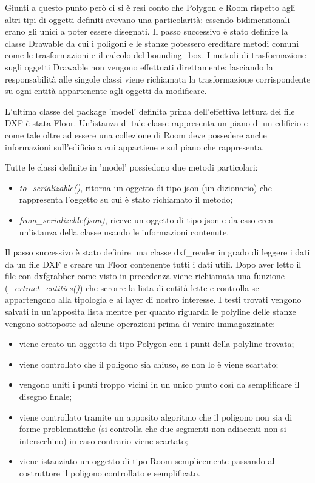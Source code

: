 \documentclass[12pt]{report}
\begin{document}
Giunti a questo punto però ci si è resi conto che Polygon e Room rispetto agli altri tipi di oggetti definiti avevano una particolarità: essendo bidimensionali erano gli unici a poter essere disegnati.
Il passo successivo è stato definire la classe Drawable da cui i poligoni e le stanze potessero ereditare metodi comuni come le trasformazioni e il calcolo del bounding\_box.
I metodi di trasformazione sugli oggetti Drawable non vengono effettuati direttamente: lasciando la responsabilità alle singole classi viene richiamata la trasformazione corrispondente su ogni entità appartenente agli oggetti da modificare.

L'ultima classe del package 'model' definita prima dell'effettiva lettura dei file DXF è stata Floor. Un'istanza di tale classe rappresenta un piano di un edificio e come tale oltre ad essere una collezione di Room deve possedere anche informazioni sull'edificio a cui appartiene e sul piano che rappresenta.

Tutte le classi definite in 'model' possiedono due metodi particolari:
\begin{itemize}
\item \textit{to\_serializable()}, ritorna un oggetto di tipo json (un dizionario) che rappresenta l'oggetto su cui è stato richiamato il metodo;
\item \textit{from\_serializeble(json)}, riceve un oggetto di tipo json e da esso crea un'istanza della classe usando le informazioni contenute.
\end{itemize}

\vspace{5mm} %

Il passo successivo è stato definire una classe dxf\_reader in grado di leggere i dati da un file DXF e creare un Floor contenente tutti i dati utili.
Dopo aver letto il file con dxfgrabber come visto in precedenza viene richiamata una funzione (\textit{\_extract\_entities()}) che scrorre la lista di entità lette e controlla se appartengono alla tipologia e ai layer di nostro interesse.
I testi trovati vengono salvati in un'apposita lista mentre per quanto riguarda le polyline delle stanze vengono sottoposte ad alcune operazioni prima di venire immagazzinate:
\begin{itemize}
\item viene creato un oggetto di tipo Polygon con i punti della polyline trovata;
\item viene controllato che il poligono sia chiuso, se non lo è viene scartato;
\item vengono uniti i punti troppo vicini in un unico punto così da semplificare il disegno finale;
\item viene controllato tramite un apposito algoritmo che il poligono non sia di forme problematiche (si controlla che due segmenti non adiacenti non si intersechino) in caso contrario viene scartato;
\item viene istanziato un oggetto di tipo Room semplicemente passando al costruttore il poligono controllato e semplificato.
\end{itemize}
\end{document}
